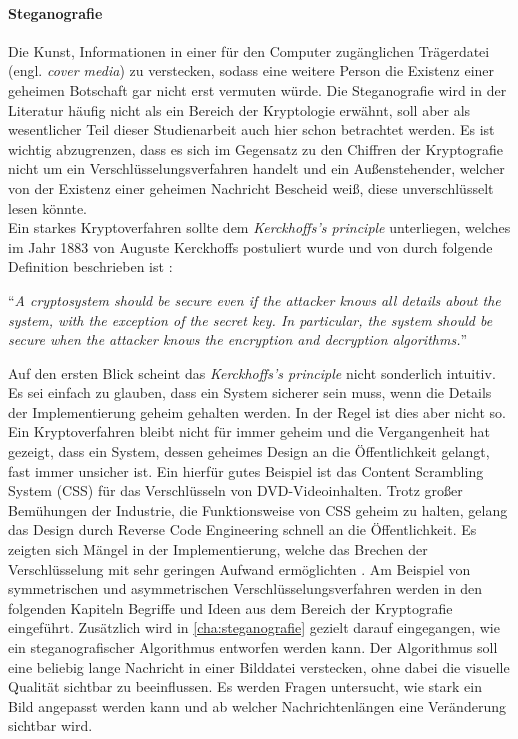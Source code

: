\paragraph{Steganografie}
Die Kunst, Informationen in einer für den Computer
zugänglichen Trä\-gerdatei (engl. \textit{cover media}) zu verstecken, sodass eine
weitere Person die Existenz einer geheimen Botschaft gar nicht erst vermuten würde.
Die Steganografie wird in der Literatur häufig nicht als ein Bereich der Kryptologie
erwähnt, soll aber als wesentlicher Teil dieser Studienarbeit auch hier
schon betrachtet werden. Es ist wichtig abzugrenzen, dass es sich
im Gegensatz zu den Chiffren der Kryptografie nicht um ein Verschlüsselungsverfahren handelt
und ein Außenstehender, welcher von der Existenz einer geheimen Nachricht Bescheid weiß,
diese unverschlüsselt lesen könnte.\\[8pt]
Ein starkes Kryptoverfahren sollte dem \textit{Kerckhoffs's principle} unterliegen, welches
im Jahr 1883 von Auguste Kerckhoffs postuliert wurde und von \citeauthor{BOOK:crypto}
durch folgende Definition beschrieben ist \parencite*[11]{BOOK:crypto}:

\begin{definition}
  \enquote{\textit{A cryptosystem should be secure even if the attacker knows all details about
      the system, with the exception of the secret key. In particular, the system should be secure when
      the attacker knows the encryption and decryption algorithms.}}
\end{definition}

\noindent
Auf den ersten Blick scheint das \textit{Kerckhoffs's principle} nicht sonderlich intuitiv.
Es sei einfach zu glauben, dass ein System
sicherer sein muss, wenn die Details der Implementierung geheim gehalten werden.
In der Regel ist dies aber nicht so. Ein Kryptoverfahren bleibt nicht für immer geheim und die
Vergangenheit hat gezeigt, dass ein System, dessen geheimes Design an die Öffentlichkeit
gelangt, fast immer unsicher ist. Ein hierfür gutes Beispiel ist das Content Scrambling System (CSS)
für das Verschlüsseln von DVD-Videoinhalten. Trotz großer Bemühungen der Industrie, die
Funktionsweise von CSS geheim zu halten, gelang das Design durch Reverse Code Engineering
schnell an die Öffentlichkeit. Es zeigten sich Mängel in der Implementierung,
welche das Brechen der Verschlüsselung mit sehr geringen Aufwand ermöglichten \parencite{SITE:CSS}.
Am Beispiel von symmetrischen und asymmetrischen Verschlüsselungsverfahren werden in den
folgenden Kapiteln Begriffe und Ideen aus dem Bereich der Kryptografie eingeführt.
Zusätzlich wird in \autoref{cha:steganografie} gezielt darauf eingegangen,
wie ein steganografischer Algorithmus entworfen werden kann.
Der Algorithmus soll eine beliebig lange Nachricht in einer Bilddatei verstecken,
ohne dabei die visuelle Qualität sichtbar zu beeinflussen. Es werden Fragen untersucht,
wie stark ein Bild angepasst werden kann und ab welcher Nachrichtenlängen
eine Veränderung sichtbar wird.
